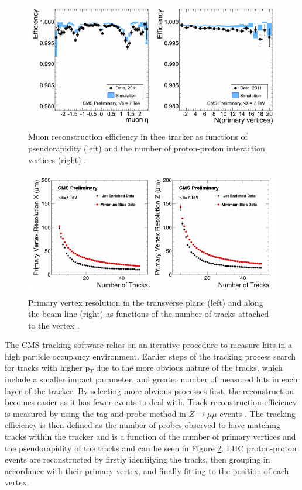 \begin{figure} 
\includegraphics[width=\textwidth]{Figures/MuonReconstructionEfficiency.png}
\caption{Muon reconstruction efficiency in thee tracker as functions of pseudorapidity (left) and the number
of proton-proton interaction vertices (right) \cite{TrackingResults}.}
\label{fig-MuonReconstructionEfficiency}
\end{figure}

\begin{figure} 
\includegraphics[width=\textwidth]{Figures/PVResolution.png}
\caption{Primary vertex resolution in the transverse plane (left) and along the beam-line (right) as functions
of the number of tracks attached to the vertex \cite{TrackingResults}.}
\label{fig-PVResolution}
\end{figure}

The CMS tracking software relies on an iterative procedure to measure hits in a high particle occupancy environment. Earlier steps of the tracking process search for tracks with higher p$_T$ due to the more obvious nature of the tracks, which include a smaller impact parameter, and greater number of measured hits in each layer of the tracker. By selecting more obvious processes first, the reconstruction becomes easier as it has fewer events to deal with. Track reconstruction efficiency is measured by using the tag-and-probe method in $Z \to \mu\mu$ events \cite{TrackingResults}. The tracking efficiency is then defined as the number of probes observed to have matching tracks within the tracker and is a function of the number of primary vertices and the pseudorapidity of the tracks and can be seen in Figure \ref{fig-PVResolution}. LHC proton-proton events are reconstructed by firstly identifying the tracks, then grouping in accordance with their primary vertex, and finally fitting to the position of each vertex.  

